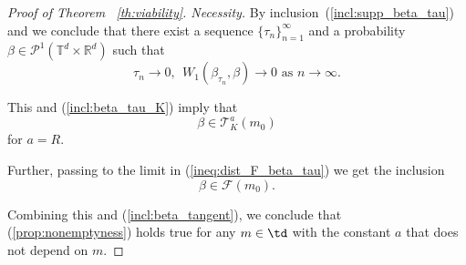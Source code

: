 \documentclass[12pt]{article}
\newcommand{\ptrd}{\mathcal{P}^1(\mathbb{T}^d\times \mathbb{R}^d)}
\begin{document}
\begin{proof}[Proof of Theorem  ~\ref{th:viability}. Necessity]
By inclusion~(\ref{incl:supp_beta_tau}) and \cite[Proposition 7.1.5]{Ambrosio} we conclude that
there exist a sequence $\{\tau_n\}_{n=1}^\infty$ and a probability $\beta\in\ptrd$ such that
$$\tau_n\rightarrow 0,\ \ W_1(\beta_{\tau_n},\beta)\rightarrow 0\mbox{ as } n\rightarrow \infty.$$

This and (\ref{incl:beta_tau_K}) imply that
\begin{equation}\label{incl:beta_tangent}
\beta\in\mathcal{T}_K^a(m_0)
\end{equation} for $a=R$.

Further,  passing to the limit in (\ref{ineq:dist_F_beta_tau}) we get the inclusion
$$\beta\in\mathcal{F}(m_0). $$

Combining this and (\ref{incl:beta_tangent}), we conclude that (\ref{prop:nonemptyness}) holds true for any $m\in\td$ with the constant $a$ that does not depend on $m$.
\end{proof}


\end{document}

